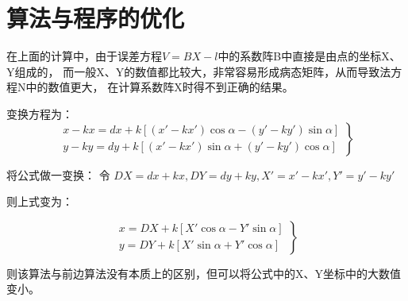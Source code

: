 
\section{算法与程序的优化}
在上面的计算中，由于误差方程$V=BX-l$中的系数阵B中直接是由点的坐标X、Y组成的，
而一般X、Y的数值都比较大，非常容易形成病态矩阵，从而导致法方程N中的数值更大，
在计算系数阵X时得不到正确的结果。

变换方程为：
$$\left.
\begin{array}{l}
\textrm{$x-kx =dx + k[(x'-kx') \cos\alpha - (y'-ky') \sin\alpha]$} \\
\textrm{$y-ky =dy + k[(x'-kx') \sin\alpha + (y'-ky') \cos\alpha]$} 
\end{array}
\right\}$$


将公式做一变换：
令 $DX = dx+kx, DY=dy+ky, X'=x'-kx', Y'=y'-ky'$

则上式变为：

$$\left.
\begin{array}{l}
\textrm{$x =DX + k[X' \cos\alpha - Y' \sin\alpha]$} \\
\textrm{$y =DY + k[X' \sin\alpha + Y' \cos\alpha]$} 
\end{array}
\right\}$$

则该算法与前边算法没有本质上的区别，但可以将公式中的X、Y坐标中的大数值变小。

